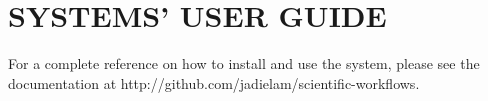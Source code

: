 \chapter{SYSTEMS' USER GUIDE}
\label{app:workflows_generator_user_guide}
For a complete reference on how to install and use the system, please see the documentation at http://github.com/jadielam/scientific-workflows.

